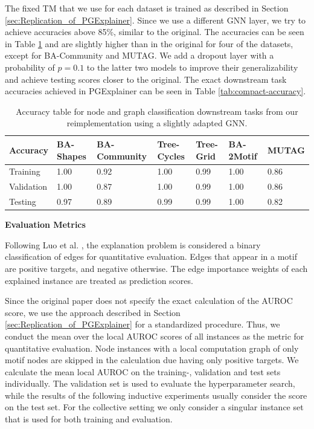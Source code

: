The fixed \ac{TM} that we use for each dataset is trained as described in Section \ref{sec:Replication_of_PGExplainer}. Since we use a different GNN layer, we try to achieve accuracies above 85\%, similar to the original. The accuracies can be seen in Table \ref{tab:our-dt-accuracy} and are slightly higher than in the original for four of the datasets, except for BA-Community and MUTAG. We add a dropout layer with a probability of $p=0.1$ to the latter two models to improve their generalizability and achieve testing scores closer to the original. The exact downstream task accuracies achieved in PGExplainer \cite{luo2020parameterized} can be seen in Table \ref{tab:compact-accuracy}. \bigskip

\begin{table}[h]
    \centering
    \small
    \begin{tabularx}{\linewidth}{l|X X X X|X X}
    \textbf{Accuracy} & BA-Shapes & BA-Community & Tree-Cycles & Tree-Grid & BA-2Motif & MUTAG \\
    \hline
    Training   & 1.00 & 0.92 & 1.00 & 0.99 & 1.00 & 0.86 \\
    Validation & 1.00 & 0.87 & 1.00 & 0.99 & 1.00 & 0.86 \\
    Testing    & 0.97 & 0.89 & 0.99 & 0.99 & 1.00 & 0.82 \\
    \end{tabularx}
    \caption[Accuracies of adapted target GNN]{Accuracy table for node and graph classification downstream tasks from our reimplementation using a slightly adapted GNN.}
    \label{tab:our-dt-accuracy}
\end{table}
\newpage
\textbf{Evaluation Metrics}\par
Following Luo et al. \cite{luo2020parameterized}, the explanation problem is considered a binary classification of edges for quantitative evaluation. Edges that appear in a motif are positive targets, and negative otherwise. The edge importance weights of each explained instance are treated as prediction scores.

Since the original paper does not specify the exact calculation of the AUROC score, we use the approach described in Section \ref{sec:Replication_of_PGExplainer} for a standardized procedure. Thus, we conduct the mean over the local AUROC scores of all instances as the metric for quantitative evaluation. Node instances with a local computation graph of only motif nodes are skipped in the calculation due having only positive targets. We calculate the mean local AUROC on the training-, validation and test sets individually. The validation set is used to evaluate the hyperparameter search, while the results of the following inductive experiments usually consider the score on the test set. For the collective setting we only consider a singular instance set that is used for both training and evaluation. \bigskip

